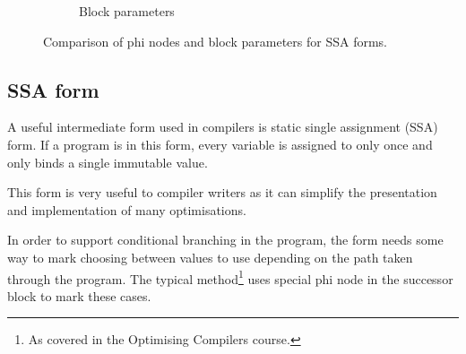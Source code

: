 \begin{figure}[h]
\begin{subfigure}[b]{0.5\textwidth}

        \caption{Block parameters}

    \end{subfigure}
    \caption{Comparison of phi nodes and block parameters for SSA forms.}
    \label{fig:phi-bp}
\end{figure}

\subsection{SSA form} \label{ssa}

A useful intermediate form used in compilers is static single assignment (SSA) form. If a program
is in this form,
every variable is assigned to only once and only binds a single immutable value.

This form is very useful to compiler writers as it can simplify the presentation and implementation
of many optimisations.

In order to support conditional branching in the program, the form needs some way to mark
choosing between values to use depending on the path taken through the program. The typical
method\footnote{As covered in the Optimising Compilers course.} uses special phi node in the
successor block to mark these cases.

